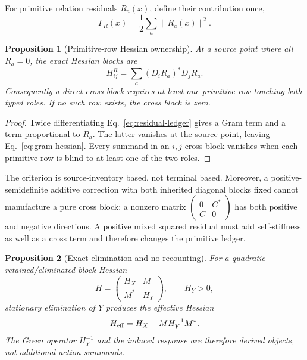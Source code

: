 \documentclass[11pt]{article}
\newtheorem{proposition}{Proposition}
\begin{document}
For primitive relation residuals \(R_a(x)\), define their contribution once,
\begin{equation}
 \Gamma_R(x)=\frac12\sum_a\lVert R_a(x)\rVert^2.
 \label{eq:residual-ledger}
\end{equation}

\begin{proposition}[Primitive-row Hessian ownership]
At a source point where all \(R_a=0\), the exact Hessian blocks are
\begin{equation}
 H_{ij}^{R}=\sum_a(D_iR_a)^*D_jR_a.
 \label{eq:gram-hessian}
\end{equation}
Consequently a direct cross block requires at least one primitive row touching
both typed roles. If no such row exists, the cross block is zero.
\end{proposition}

\begin{proof}
Twice differentiating Eq.~\eqref{eq:residual-ledger} gives a Gram term and a
term proportional to \(R_a\). The latter vanishes at the source point, leaving
Eq.~\eqref{eq:gram-hessian}. Every summand in an \(i,j\) cross block vanishes
when each primitive row is blind to at least one of the two roles.
\end{proof}

The criterion is source-inventory based, not terminal based. Moreover, a
positive-semidefinite additive correction with both inherited diagonal blocks
fixed cannot manufacture a pure cross block: a nonzero matrix
\(\left(\begin{smallmatrix}0&C^*\\C&0\end{smallmatrix}\right)\) has both
positive and negative directions. A positive mixed squared residual must add
self-stiffness as well as a cross term and therefore changes the primitive
ledger.

\begin{proposition}[Exact elimination and no recounting]
For a quadratic retained/eliminated block Hessian
\begin{equation}
 H=\begin{pmatrix}H_X&M\\M^*&H_Y\end{pmatrix},\qquad H_Y>0,
\end{equation}
stationary elimination of \(Y\) produces the effective Hessian
\begin{equation}
 H_{\rm eff}=H_X-MH_Y^{-1}M^*.
 \label{eq:schur-ledger}
\end{equation}
The Green operator \(H_Y^{-1}\) and the induced response are therefore derived
objects, not additional action summands.
\end{proposition}
\end{document}

